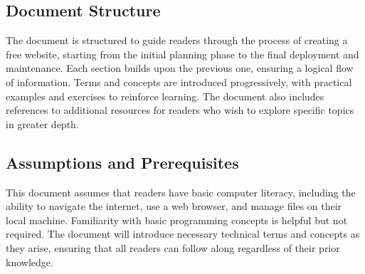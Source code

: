 \subsection{Document Structure}

The document is structured to guide readers through the process of creating a free website, starting from the initial planning phase to the final deployment and maintenance. Each section builds upon the previous one, ensuring a logical flow of information. Terms and concepts are introduced progressively, with practical examples and exercises to reinforce learning. The document also includes references to additional resources for readers who wish to explore specific topics in greater depth.

\subsection{Assumptions and Prerequisites}

This document assumes that readers have basic computer literacy, including the ability to navigate the internet, use a web browser, and manage files on their local machine. Familiarity with basic programming concepts is helpful but not required. The document will introduce necessary technical terms and concepts as they arise, ensuring that all readers can follow along regardless of their prior knowledge.
